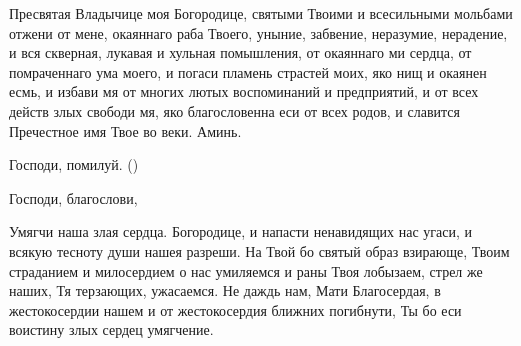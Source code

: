 \begin{mymulticols}
Пресвятая Владычице моя Богородице, святыми Твоими и всесильными мольбами отжени от мене, окаяннаго раба Твоего, уныние, забвение, неразумие, нерадение, и вся скверная, лукавая и хульная помышления, от окаяннаго ми сердца, от помраченнаго ума моего, и погаси пламень страстей моих, яко нищ и окаянен есмь, и избави мя от многих лютых воспоминаний и предприятий, и от всех действ злых свободи мя, яко благословенна еси от всех родов, и славится Пречестное имя Твое во веки. Аминь.

\Chestneyshuyu

Господи, помилуй. ()

Господи, благослови, 

\end{mymulticols}

\mychapterending



\tolkopoblagosloveniyu

\begin{mymulticols}



Умягчи наша злая сердца. Богородице, и напасти ненавидящих нас угаси, и всякую тесноту души нашея разреши. На Твой бо святый образ взирающе, Твоим страданием и милосердием о нас умиляемся и раны Твоя лобызаем, стрел же наших, Тя терзающих, ужасаемся. Не даждь нам, Мати Благосердая, в жестокосердии нашем и от жестокосердия ближних погибнути, Ты бо еси воистину злых сердец умягчение.

\end{mymulticols}

\mychapterending

